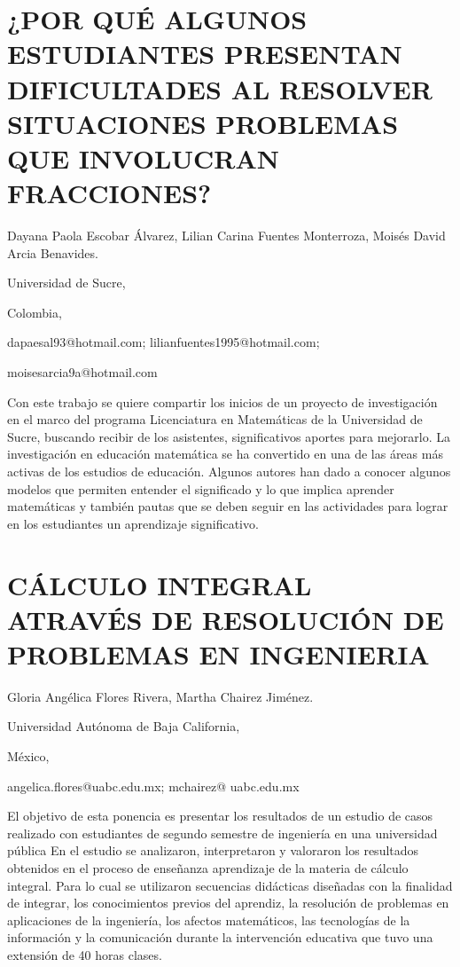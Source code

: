\section{¿POR QUÉ ALGUNOS ESTUDIANTES PRESENTAN DIFICULTADES AL RESOLVER SITUACIONES
PROBLEMAS QUE INVOLUCRAN FRACCIONES?}

\begin{datos}

Dayana Paola Escobar Álvarez, Lilian Carina Fuentes Monterroza, Moisés
David Arcia Benavides.

Universidad de Sucre,

Colombia,

dapaesal93@hotmail.com; lilianfuentes1995@hotmail.com;

moisesarcia9a@hotmail.com

\end{datos}

Con este trabajo se quiere compartir los inicios de un proyecto de
investigación en el marco del programa Licenciatura en Matemáticas
de la Universidad de Sucre, buscando recibir de los asistentes, significativos
aportes para mejorarlo. La investigación en educación matemática se
ha convertido en una de las áreas más activas de los estudios de educación.
Algunos autores han dado a conocer algunos modelos que permiten entender
el significado y lo que implica aprender matemáticas y también pautas
que se deben seguir en las actividades para lograr en los estudiantes
un aprendizaje significativo.


\section{CÁLCULO INTEGRAL ATRAVÉS DE RESOLUCIÓN DE PROBLEMAS EN INGENIERIA }

\begin{datos}

Gloria Angélica Flores Rivera, Martha Chairez Jiménez.

Universidad Autónoma de Baja California,

México,

angelica.flores@uabc.edu.mx; mchairez@ uabc.edu.mx

\end{datos}

El objetivo de esta ponencia es presentar los resultados de un estudio
de casos realizado con estudiantes de segundo semestre de ingeniería
en una universidad pública En el estudio se analizaron, interpretaron
y valoraron los resultados obtenidos en el proceso de enseñanza aprendizaje
de la materia de cálculo integral. Para lo cual se utilizaron secuencias
didácticas diseñadas con la finalidad de integrar, los conocimientos
previos del aprendiz, la resolución de problemas en aplicaciones de
la ingeniería, los afectos matemáticos, las tecnologías de la información
y la comunicación durante la intervención educativa que tuvo una extensión
de 40 horas clases. 


